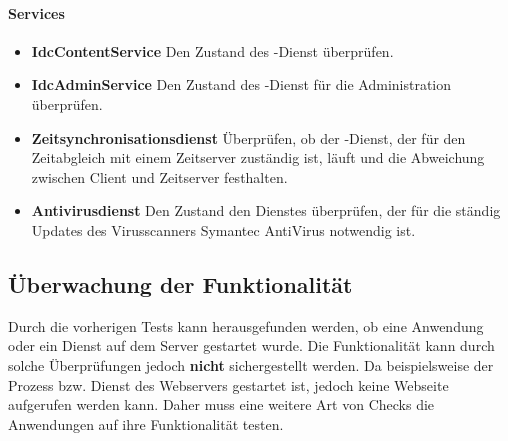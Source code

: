 \paragraph{Services}
\begin{itemize}
\item \textbf{IdcContentService}  Den Zustand des -Dienst überprüfen.
\item \textbf{IdcAdminService}  Den Zustand des -Dienst für die Administration überprüfen.
\item \textbf{Zeitsynchronisationsdienst} Überprüfen, ob der -Dienst, der für den Zeitabgleich mit einem Zeitserver zuständig ist, läuft und die Abweichung zwischen Client und Zeitserver festhalten.
\item \textbf{Antivirusdienst} Den Zustand den Dienstes überprüfen, der für die ständig Updates des Virusscanners Symantec AntiVirus notwendig ist.
\end{itemize}

\subsection{Überwachung der Funktionalität}
\label{funztest}
Durch die vorherigen Tests kann herausgefunden werden, ob eine Anwendung oder ein Dienst auf dem Server gestartet wurde.
Die Funktionalität kann durch solche Überprüfungen jedoch \textbf{nicht} sichergestellt werden.
Da beispielsweise der Prozess bzw. Dienst des Webservers gestartet ist, jedoch keine Webseite aufgerufen werden kann.
Daher muss eine weitere Art von Checks die Anwendungen auf ihre Funktionalität testen.

